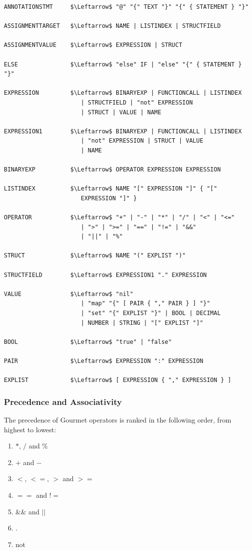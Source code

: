 \begin{lstlisting}[caption={Gourmet's grammar in EBNF notation.}, captionpos=b, label={The EBNF grammar of the Gourmet programming language.}]
ANNOTATIONSTMT     $\Leftarrow$ "@" "{" TEXT "}" "{" { STATEMENT } "}"

ASSIGNMENTTARGET   $\Leftarrow$ NAME | LISTINDEX | STRUCTFIELD

ASSIGNMENTVALUE    $\Leftarrow$ EXPRESSION | STRUCT

ELSE               $\Leftarrow$ "else" IF | "else" "{" { STATEMENT } "}"

EXPRESSION         $\Leftarrow$ BINARYEXP | FUNCTIONCALL | LISTINDEX
                      | STRUCTFIELD | "not" EXPRESSION
                      | STRUCT | VALUE | NAME

EXPRESSION1        $\Leftarrow$ BINARYEXP | FUNCTIONCALL | LISTINDEX
                      | "not" EXPRESSION | STRUCT | VALUE
                      | NAME

BINARYEXP          $\Leftarrow$ OPERATOR EXPRESSION EXPRESSION

LISTINDEX          $\Leftarrow$ NAME "[" EXPRESSION "]" { "["
                      EXPRESSION "]" }

OPERATOR           $\Leftarrow$ "+" | "-" | "*" | "/" | "<" | "<="
                      | ">" | ">=" | "==" | "!=" | "&&"
                      | "||" | "%"

STRUCT             $\Leftarrow$ NAME "(" EXPLIST ")"

STRUCTFIELD        $\Leftarrow$ EXPRESSION1 "." EXPRESSION

VALUE              $\Leftarrow$ "nil"
                      | "map" "{" [ PAIR { "," PAIR } ] "}"
                      | "set" "{" EXPLIST "}" | BOOL | DECIMAL
                      | NUMBER | STRING | "[" EXPLIST "]"

BOOL               $\Leftarrow$ "true" | "false"

PAIR               $\Leftarrow$ EXPRESSION ":" EXPRESSION

EXPLIST            $\Leftarrow$ [ EXPRESSION { "," EXPRESSION } ]
\end{lstlisting}

\subsubsection{Precedence and Associativity}

The precedence of Gourmet operators is ranked in the following order, from highest to lowest:

\begin{enumerate}
    \item $*$, $/$ and $\%$
    \item $+$ and $-$
    \item $<$, $<=$, $>$ and $>=$
    \item $==$ and $!=$
    \item $\&\&$ and $||$
    \item $.$
    \item not
\end{enumerate}

